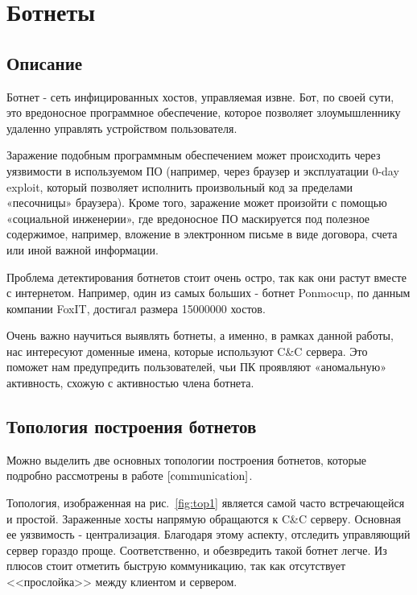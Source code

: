 \documentclass[a4paper,14pt]{extreport} %
\begin{document}
\chapter{Ботнеты}
\section{Описание}
Ботнет - сеть инфицированных хостов, управляемая извне. Бот, по своей сути, это вредоносное программное обеспечение, которое позволяет злоумышленнику удаленно управлять устройством пользователя.
	
Заражение подобным программным обеспечением может происходить через
уязвимости в используемом ПО (например, через браузер и эксплуатации 0-day exploit, который позволяет исполнить произвольный код за пределами
«песочницы» браузера). Кроме того, заражение может произойти с помощью
«социальной инженерии», где вредоносное ПО маскируется под полезное
содержимое, например, вложение в электронном письме в виде договора, счета или иной важной информации.

Проблема детектирования ботнетов стоит очень остро, так как они растут вместе с интернетом. Например, один из самых больших - ботнет Ponmocup, по данным компании FoxIT, достигал размера 15000000 хостов.
	
Очень важно научиться выявлять ботнеты, а именно, в рамках данной
работы, нас интересуют доменные имена, которые используют C\&C сервера.
Это поможет нам предупредить пользователей, чьи ПК проявляют
«аномальную» активность, схожую с активностью члена ботнета.
	
\section{Топология построения ботнетов}
Можно выделить две основных топологии построения ботнетов, которые подробно рассмотрены в работе $\cite{communication}$.

Топология, изображенная на рис.~\ref{fig:top1} является самой часто встречающейся и простой. Зараженные хосты напрямую обращаются к C\&C серверу. Основная ее уязвимость - централизация. Благодаря этому аспекту, отследить управляющий сервер гораздо проще. Соответственно, и обезвредить такой ботнет легче. Из плюсов стоит отметить быструю коммуникацию, так как отсутствует <<прослойка>> между клиентом и сервером.
\end{document}
